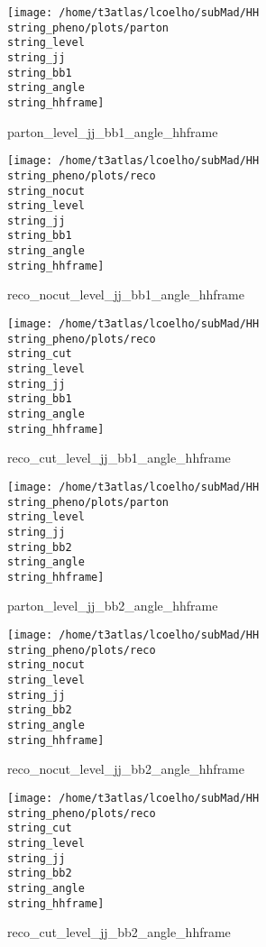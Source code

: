 \documentclass[a4paper,onecolumn,final,11pt]{article}
\begin{document}
\begin{figure}[H] 
\centering 
\begin{minipage}{.32\textwidth} 
        \centering 
        \hspace{0cm} 
        \texttt{[image: /home/t3atlas/lcoelho/subMad/HH\\string\_pheno/plots/parton\\string\_level\\string\_jj\\string\_bb1\\string\_angle\\string\_hhframe]} 
        \caption{parton_level_jj_bb1_angle_hhframe} 
\end{minipage} 
\hfill 
\begin{minipage}{.32\textwidth} 
        \centering 
        \hspace{0cm} 
    \texttt{[image: /home/t3atlas/lcoelho/subMad/HH\\string\_pheno/plots/reco\\string\_nocut\\string\_level\\string\_jj\\string\_bb1\\string\_angle\\string\_hhframe]} 
        \caption{reco_nocut_level_jj_bb1_angle_hhframe} 
\end{minipage} 
\hfill 
\begin{minipage}{.32\textwidth} 
        \centering 
        \hspace{0cm} 
    \texttt{[image: /home/t3atlas/lcoelho/subMad/HH\\string\_pheno/plots/reco\\string\_cut\\string\_level\\string\_jj\\string\_bb1\\string\_angle\\string\_hhframe]} 
        \caption{reco_cut_level_jj_bb1_angle_hhframe} 
\end{minipage} 
\end{figure} 
 
\begin{figure}[H] 
\centering 
\begin{minipage}{.32\textwidth} 
        \centering 
        \hspace{0cm} 
        \texttt{[image: /home/t3atlas/lcoelho/subMad/HH\\string\_pheno/plots/parton\\string\_level\\string\_jj\\string\_bb2\\string\_angle\\string\_hhframe]} 
        \caption{parton_level_jj_bb2_angle_hhframe} 
\end{minipage} 
\hfill 
\begin{minipage}{.32\textwidth} 
        \centering 
        \hspace{0cm} 
    \texttt{[image: /home/t3atlas/lcoelho/subMad/HH\\string\_pheno/plots/reco\\string\_nocut\\string\_level\\string\_jj\\string\_bb2\\string\_angle\\string\_hhframe]} 
        \caption{reco_nocut_level_jj_bb2_angle_hhframe} 
\end{minipage} 
\hfill 
\begin{minipage}{.32\textwidth} 
        \centering 
        \hspace{0cm} 
    \texttt{[image: /home/t3atlas/lcoelho/subMad/HH\\string\_pheno/plots/reco\\string\_cut\\string\_level\\string\_jj\\string\_bb2\\string\_angle\\string\_hhframe]} 
        \caption{reco_cut_level_jj_bb2_angle_hhframe} 
\end{minipage} 
\end{figure} 
 
\end{document}
